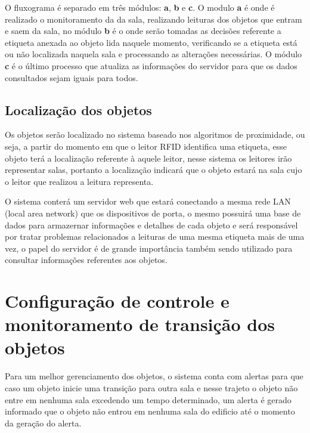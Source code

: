 \par
O fluxograma é separado em três módulos: \textbf{a}, \textbf{b} e \textbf{c}. O modulo \textbf{a} é onde é realizado o 
monitoramento da da sala, realizando leituras dos objetos que entram e saem da sala, no módulo \textbf{b} é o onde serão 
tomadas as decisões referente a etiqueta anexada ao objeto lida naquele momento, verificando se a etiqueta está ou não 
localizada naquela sala e processando as alterações necessárias. O módulo \textbf{c} é o último processo que atualiza as 
informações do servidor para que os dados consultados sejam iguais para todos.


\subsection{Localização dos objetos}

Os objetos serão localizado no sistema baseado nos algoritmos de proximidade, ou seja, a partir do momento em que o leitor 
RFID identifica uma etiqueta, esse objeto terá a localização referente à aquele leitor, nesse sistema os leitores irão representar 
salas, portanto a localização indicará que o objeto estará na sala cujo o leitor que realizou a leitura representa.

\par{}
O sistema conterá um servidor web que estará conectando a mesma rede LAN (local area network) que os dispositivos de porta, o mesmo possuirá uma base de dados para armazernar informações e detalhes de cada objeto e será responsável por tratar problemas relacionados a leituras de uma mesma etiqueta mais de uma vez, 
o papel do servidor é de grande importância também sendo utilizado para consultar informações referentes aos objetos.


\section{Configuração de controle e monitoramento de transição dos objetos}

Para um melhor gerenciamento dos objetos, o sistema conta com alertas para que caso um objeto inicie uma transição 
para outra sala e nesse trajeto o objeto não entre em nenhuma sala excedendo um tempo determinado, um alerta é gerado 
informado que o objeto não entrou em nenhuma sala do edificio até o momento da geração do alerta.

